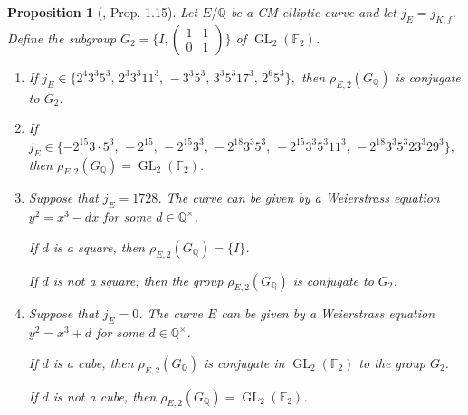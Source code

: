 \documentclass[11pt]{amsart}
\newtheorem{prop}[defn]{Proposition}
\theoremstyle{definition}
\newenvironment{romanenum}{\hfill \begin{enumerate} \renewcommand{\theenumi}{\roman{enumi}}}{\end{enumerate}}
\newcommand{\Q}{\mathbb Q}
\newcommand{\QQ}{\mathbb Q}
\newcommand{\FF}{\mathbb F}
\newcommand{\GL}{\operatorname{GL}}
\begin{document}
\begin{prop}[\cite{zywina}, Prop. 1.15] \label{prop-zywina2}
Let $E/\QQ$ be a CM elliptic curve and let $j_E=j_{K,f}$.  Define the subgroup $G_2=\{ I, \left(\begin{smallmatrix}1 & 1 \\0 & 1 \end{smallmatrix}\right)\}$ of $\GL_2(\FF_2)$.
\begin{romanenum}
\item \label{P: prime 2 i}
If  $j_E \in \{2^4 3^3 5^3,\, 2^3 3^3 11^3,\, -3^3 5^3,\, 3^3 5^3 17^3,\, 2^6 5^3\},$
then $\rho_{E,2}(G_\Q)$ is conjugate to $G_2$.
\item
If $j_E \in \{ -2^{15} 3 \cdot 5^3,\, -2^{15},\, -2^{15} 3^3,\, -2^{18} 3^3 5^3,\, -2^{15} 3^3 5^3 11^3,\, -2^{18} 3^3 5^3 23^3 29^3\},$
then $\rho_{E,2}(G_\Q)=\GL_2(\FF_2)$.

\item
Suppose that $j_E=1728$.  The curve can be given by a Weierstrass equation $y^2=x^3-dx$ for some $d\in \QQ^\times$.

\noindent
If $d$ is a square, then $\rho_{E,2}(G_\Q)=\{I\}$.  

\noindent 
If $d$ is not a square, then the group $\rho_{E,2}(G_\Q)$ is conjugate to $G_2$.  

\item 
Suppose that $j_E=0$.  The curve $E$ can be given by a Weierstrass equation $y^2=x^3+d$ for some $d\in \QQ^\times$. 

\noindent 
If $d$ is a cube, then $\rho_{E,2}(G_\Q)$ is conjugate in $\GL_2(\FF_2)$ to the group $G_2$.

\noindent 
If $d$ is not a cube, then $\rho_{E,2}(G_\Q)=\GL_2(\FF_2)$. 
\end{romanenum}
\end{prop}
\end{document}
